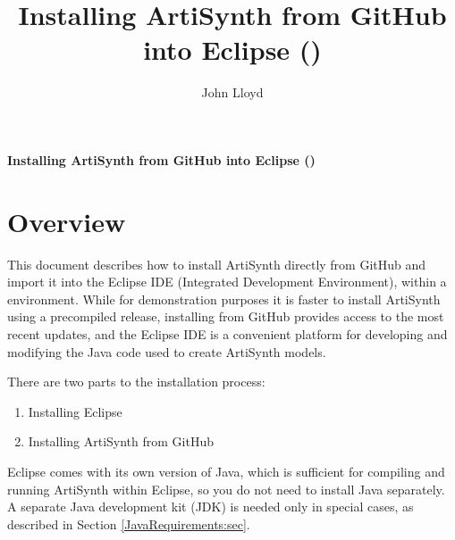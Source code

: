 \usepackage{enumitem}

\iflatexml
\else
\fancyhead[L,C,R]{}
\fancyfoot[L,R]{}
\fancyfoot[C]{\thepage}
\renewcommand{\headrulewidth}{0pt}
\renewcommand{\footrulewidth}{0pt}
\fi

\def\ArtHome[#1]{{\tt <ARTISYNTH\_HOME>#1}}

\title{Installing ArtiSynth from GitHub into Eclipse (\SYSTEM{})}
\author{John Lloyd}
\iflatexml
\date{}
\fi




\iflatexml{\large\pubdate}\fi


\iflatexml\else
\begin{center}
{\sffamily\Large\bfseries
Installing ArtiSynth from GitHub into Eclipse (\SYSTEM{})}
\end{center}
\bigskip
\fi

\section{Overview}

This document describes how to install ArtiSynth directly from GitHub
and import it into the Eclipse IDE (Integrated Development
Environment), within a \SYSTEM{} environment. While for demonstration
purposes it is faster to install ArtiSynth using a precompiled
release, installing from GitHub provides access to the most recent
updates, and the Eclipse IDE is a convenient platform for developing
and modifying the Java code used to create ArtiSynth models.

There are two parts to the installation process:

\begin{enumerate}

\item Installing Eclipse

\item Installing ArtiSynth from GitHub

\end{enumerate}

Eclipse comes with its own version of Java, which is sufficient for
compiling and running ArtiSynth within Eclipse, so you do not need to
install Java separately. A separate Java development kit (JDK) is
needed only in special cases, as described in Section
\ref{JavaRequirements:sec}.

